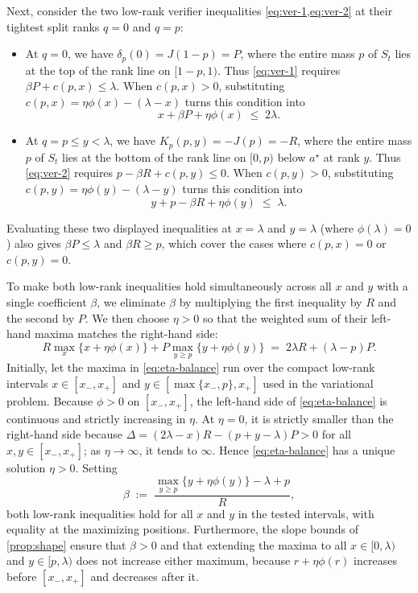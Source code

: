 \documentclass[11pt]{article}
\numberwithin{equation}{section}
\theoremstyle{plain}
\theoremstyle{definition}
\newcommand{\1}{\mathbf{1}}
\begin{document}
Next, consider the two low-rank verifier inequalities \cref{eq:ver-1,eq:ver-2} at their tightest split ranks $q = 0$ and $q = p$:
\begin{itemize}
  \item At $q = 0$, we have $\delta_p(0) = J(1 - p) = P$, where the entire mass $p$ of $S_t$ lies at the top of the rank line on $[1 - p, 1)$. Thus \cref{eq:ver-1} requires $\beta P + c(p, x) \le \lambda$. When $c(p, x) > 0$, substituting $c(p, x) = \eta\phi(x) - (\lambda - x)$ turns this condition into
  \[
    x + \beta P + \eta\phi(x) \;\le\; 2\lambda.
  \]
  \item At $q = p \le y < \lambda$, we have $K_p(p, y) = -J(p) = -R$, where the entire mass $p$ of $S_t$ lies at the bottom of the rank line on $[0, p)$ below $a^\star$ at rank $y$. Thus \cref{eq:ver-2} requires $p - \beta R + c(p, y) \le 0$. When $c(p, y) > 0$, substituting $c(p, y) = \eta\phi(y) - (\lambda - y)$ turns this condition into
  \[
    y + p - \beta R + \eta\phi(y) \;\le\; \lambda.
  \]
\end{itemize}
Evaluating these two displayed inequalities at $x = \lambda$ and $y = \lambda$ (where $\phi(\lambda) = 0$) also gives $\beta P \le \lambda$ and $\beta R \ge p$, which cover the cases where $c(p, x) = 0$ or $c(p, y) = 0$.

To make both low-rank inequalities hold simultaneously across all $x$ and $y$ with a single coefficient $\beta$, we eliminate $\beta$ by multiplying the first inequality by $R$ and the second by $P$. We then choose $\eta > 0$ so that the weighted sum of their left-hand maxima matches the right-hand side:
\begin{equation}
  R \max_{x}\bigl\{x + \eta\phi(x)\bigr\} + P \max_{y \ge p}\bigl\{y + \eta\phi(y)\bigr\}
  \;=\; 2\lambda R + (\lambda - p)P.
  \label{eq:eta-balance}
\end{equation}
Initially, let the maxima in \cref{eq:eta-balance} run over the compact low-rank intervals $x \in [x_-, x_+]$ and $y \in [\max\{x_-, p\}, x_+]$ used in the variational problem. Because $\phi > 0$ on $[x_-, x_+]$, the left-hand side of \cref{eq:eta-balance} is continuous and strictly increasing in $\eta$. At $\eta = 0$, it is strictly smaller than the right-hand side because $\Delta = (2\lambda - x)R - (p + y - \lambda)P > 0$ for all $x, y \in [x_-, x_+]$; as $\eta \to \infty$, it tends to $\infty$. Hence \cref{eq:eta-balance} has a unique solution $\eta > 0$. Setting
\begin{equation}
  \beta \;:=\; \frac{\max_{y \ge p}\{y + \eta\phi(y)\} - \lambda + p}{R},
  \label{eq:beta-def}
\end{equation}
both low-rank inequalities hold for all $x$ and $y$ in the tested intervals, with equality at the maximizing positions. Furthermore, the slope bounds of \cref{prop:shape} ensure that $\beta > 0$ and that extending the maxima to all $x \in [0, \lambda)$ and $y \in [p, \lambda)$ does not increase either maximum, because $r + \eta\phi(r)$ increases before $[x_-, x_+]$ and decreases after it.
\end{document}
